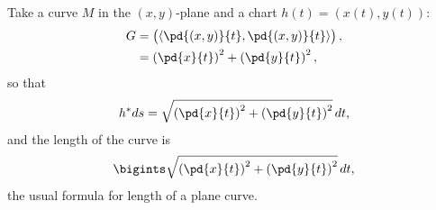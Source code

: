\begin{example} 
Take a curve \(M\) in the \((x,y)\)-plane and a chart \(h(t)=\left(x(t),y(t)\right)\):
\begin{align*}
G 
&= 
\begin{pmatrix}
\left<\pd{(x,y)}{t},\pd{(x,y)}{t}\right>
\end{pmatrix},
\\
&=
\left(\pd{x}{t}\right)^2 + \left(\pd{y}{t}\right)^2,
\end{align*}
so that
\[
h^* ds = 
\sqrt{ \left(\pd{x}{t}\right)^2 + \left(\pd{y}{t}\right)^2 } \, dt,
\]
and the length of the curve is
\[
\bigints \sqrt{ \left(\pd{x}{t}\right)^2 + \left(\pd{y}{t}\right)^2 } \, dt,
\]
the usual formula for length of a plane curve.
\end{example}



